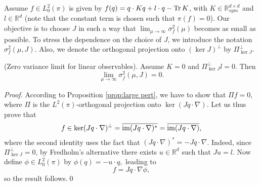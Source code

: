Assume $f\in L_{0}^{2}(\pi)$ is given by $f(q)=q\cdot Kq+l\cdot q -\operatorname{Tr} K$,  with $K\in\mathbb{R}_{sym}^{d\times d}$ and $l\in\mathbb{R}^{d}$ (note that the constant term is chosen such that $ \pi(f)=0 $). Our objective is to choose $J$ in such a way that $\lim_{\mu\rightarrow\infty}\sigma_{f}^{2}(\mu)$ becomes as small as possible. To stress the dependence on the choice
of $J$, we introduce the notation $\sigma_{f}^{2}(\mu,J)$. Also, we denote the orthogonal projection onto $(\ker J)^{\perp}$ by $\Pi^{\perp}_{\ker J}$.
\begin{lemma}
	\label{lem:lin_observables}{(Zero variance limit for linear observables).} Assume $K=0$ and $\Pi^{\perp}_{\ker J}l=0$. Then 
	\[
	\lim_{\mu\rightarrow\infty}\sigma_{f}^{2}(\mu,J)=0.
	\]
\end{lemma}
\begin{proof}
	According to Proposition \ref{prop:large pert}, we have to show that
	$\Pi f=0$, where $\Pi$ is the $L^{2}(\pi)$-orthogonal projection
	onto $\ker(Jq\cdot\nabla)$. Let us thus prove that 
	\[
	f\in\ker(Jq\cdot\nabla)^{\perp}=\overline{\operatorname{im}(Jq\cdot\nabla)^{*}}=\overline{\operatorname{im}(Jq\cdot\nabla)},
	\]
	where the second identity uses the fact that $(Jq\cdot\nabla)^{*}=-Jq\cdot\nabla$.
	Indeed, since $\Pi^{\perp}_{\ker J}=0$, by Fredholm's alternative there exists $u \in \mathbb{R}^d$ such that $Ju=l$. Now define $\phi\in L_{0}^{2}(\pi)$
	by $\phi(q)=-u\cdot q,$ leading to 
	\[
	f=Jq\cdot\nabla\phi,
	\]
	so the result follows.\qed
\end{proof}

